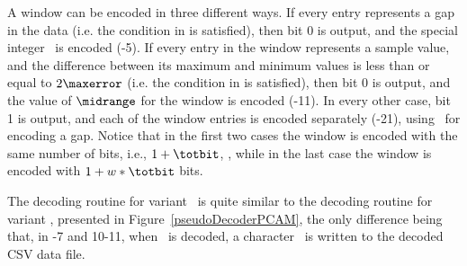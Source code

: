 


A window can be encoded in three different ways. If every entry represents a gap in the data (i.e. the condition in  is satisfied), then bit 0 is output, and the special integer \nodata\ is encoded (-5). If every entry in the window represents a sample value, and the difference between its maximum and minimum values is less than or equal to $2\maxerror$ (i.e. the condition in  is satisfied), then bit 0 is output, and the value of $\midrange$ for the window is encoded (-11). In every other case, bit 1 is output, and each of the window entries is encoded separately (-21), using \nodata\ for encoding a gap. Notice that in the first two cases the window is encoded with the same number of bits, i.e., $1 + \totbit$, \wheretotbit, while in the last case the window is encoded with $1 + w*\totbit$ bits.


The decoding routine for variant \NOmaskalgo\ is quite similar to the decoding routine for variant \maskalgo, presented in Figure~\ref{pseudoDecoderPCAM}, the only difference being that, in -7 and 10-11, when \nodata\ is decoded, a character \noData\ is written to the decoded CSV data file.


